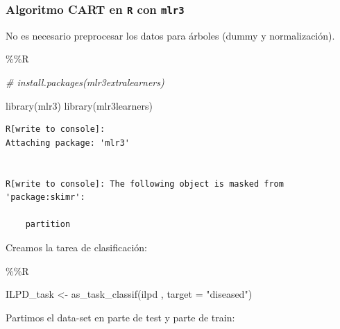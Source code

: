 \documentclass[
  11pt,
  a4paper,
]{article}
\newenvironment{Shaded}{\begin{snugshade}}{\end{snugshade}}
\newcommand{\AttributeTok}[1]{\textcolor[rgb]{0.77,0.63,0.00}{#1}}
\newcommand{\CommentTok}[1]{\textcolor[rgb]{0.56,0.35,0.01}{\textit{#1}}}
\newcommand{\DecValTok}[1]{\textcolor[rgb]{0.00,0.00,0.81}{#1}}
\newcommand{\FloatTok}[1]{\textcolor[rgb]{0.00,0.00,0.81}{#1}}
\newcommand{\FunctionTok}[1]{\textcolor[rgb]{0.00,0.00,0.00}{#1}}
\newcommand{\NormalTok}[1]{#1}
\newcommand{\OtherTok}[1]{\textcolor[rgb]{0.56,0.35,0.01}{#1}}
\newcommand{\SpecialCharTok}[1]{\textcolor[rgb]{0.00,0.00,0.00}{#1}}
\newcommand{\StringTok}[1]{\textcolor[rgb]{0.31,0.60,0.02}{#1}}
\begin{document}
\hypertarget{algoritmo-cart-en-r-con-mlr3}{%
\subsubsection{\texorpdfstring{Algoritmo CART en \texttt{R} con
\texttt{mlr3}}{Algoritmo CART en R con mlr3}}\label{algoritmo-cart-en-r-con-mlr3}}

No es necesario preprocesar los datos para árboles (dummy y
normalización).

\begin{Shaded}
\begin{Highlighting}[]
\SpecialCharTok{\%\%}\NormalTok{R}

\CommentTok{\# install.packages(\textquotesingle{}mlr3extralearners\textquotesingle{})}

\FunctionTok{library}\NormalTok{(mlr3)}
\FunctionTok{library}\NormalTok{(mlr3learners)}
\end{Highlighting}
\end{Shaded}

\begin{verbatim}
R[write to console]: 
Attaching package: 'mlr3'


R[write to console]: The following object is masked from 'package:skimr':

    partition
\end{verbatim}

Creamos la tarea de clasificación:

\begin{Shaded}
\begin{Highlighting}[]
\SpecialCharTok{\%\%}\NormalTok{R}

\NormalTok{ILPD\_task }\OtherTok{\textless{}{-}} \FunctionTok{as\_task\_classif}\NormalTok{(ilpd , }\AttributeTok{target =} \StringTok{"diseased"}\NormalTok{)}
\end{Highlighting}
\end{Shaded}

\newpage

Partimos el data-set en parte de test y parte de train:

\begin{Shaded}
\end{Shaded}
\end{document}
